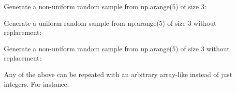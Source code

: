 \documentclass[letterpaper,10pt,english]{sphinxmanual}
\begin{document}
\begin{fulllineitems}
Generate a non-uniform random sample from np.arange(5) of size 3:

\begin{sphinxVerbatim}[commandchars=\\\{\}]
  \PYG{p}{[}    \PYG{p}{]}
\end{sphinxVerbatim}

Generate a uniform random sample from np.arange(5) of size 3 without
replacement:

\begin{sphinxVerbatim}[commandchars=\\\{\}]
  
\end{sphinxVerbatim}

Generate a non-uniform random sample from np.arange(5) of size
3 without replacement:

\begin{sphinxVerbatim}[commandchars=\\\{\}]
   \PYG{p}{[}    \PYG{p}{]}
\end{sphinxVerbatim}

Any of the above can be repeated with an arbitrary array-like
instead of just integers. For instance:


\end{fulllineitems}
\end{document}
